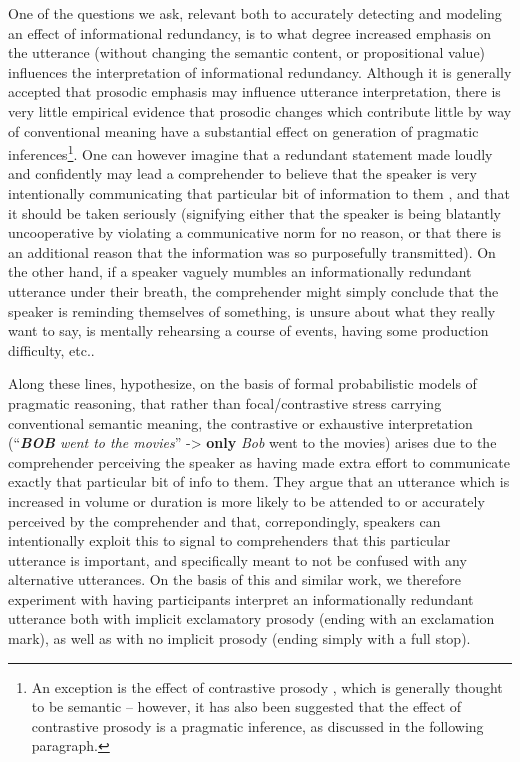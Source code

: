 One of the questions we ask, relevant both to accurately detecting and
modeling an effect of informational redundancy, is to what degree
increased emphasis on the utterance (without changing the semantic
content, or propositional value) influences the interpretation of
informational redundancy. Although it is generally accepted that
prosodic emphasis may influence utterance interpretation, there is very
little empirical evidence that prosodic changes which contribute little
by way of conventional meaning have a substantial effect on generation
of pragmatic inferences\footnote{An exception is the effect of
  contrastive prosody \citep[e.g.,][]{Kurumada2012}, which
  is generally thought to be semantic -- however, it has also been
  suggested that the effect of contrastive prosody is a pragmatic
  inference, as discussed in the following paragraph.}. One can however
imagine that a redundant statement made loudly and confidently may lead
a comprehender to believe that the speaker is very intentionally
communicating that particular bit of information to them \citep[cf.]{Wilson2004}, and that it should be taken seriously (signifying either
that the speaker is being blatantly uncooperative by violating a
communicative norm for no reason, or that there is an additional reason
that the information was so purposefully transmitted). On the other
hand, if a speaker vaguely mumbles an informationally redundant
utterance under their breath, the comprehender might simply conclude
that the speaker is reminding themselves of something, is unsure about
what they really want to say, is mentally rehearsing a course of events,
having some production difficulty, etc..

Along these lines, \citet{Bergen2015} hypothesize, on the basis
of formal probabilistic models of pragmatic reasoning, that rather than
focal/contrastive stress carrying conventional semantic meaning, the
contrastive or exhaustive interpretation (\enquote{\emph{\textbf{BOB}
went to the movies}} -\textgreater{} \textbf{only} \emph{Bob} went to
the movies) arises due to the comprehender perceiving the speaker as
having made extra effort to communicate exactly that particular bit of
info to them. They argue that an utterance which is increased in volume
or duration is more likely to be attended to or accurately perceived by
the comprehender and that, correpondingly, speakers can intentionally
exploit this to signal to comprehenders that this particular utterance
is important, and specifically meant to not be confused with any
alternative utterances. On the basis of this and similar work, we
therefore experiment with having participants interpret an
informationally redundant utterance both with implicit exclamatory
prosody (ending with an exclamation mark), as well as with no implicit
prosody (ending simply with a full stop).

